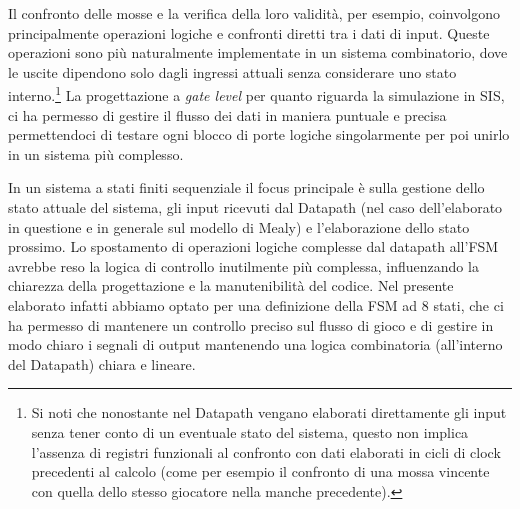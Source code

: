 \documentclass[a4paper]{report}
\begin{document}
Il confronto delle mosse e la verifica della loro validità, per esempio, coinvolgono principalmente operazioni logiche e confronti diretti tra i dati di input.
Queste operazioni sono più naturalmente implementate in un sistema combinatorio, dove le uscite dipendono solo dagli ingressi attuali senza considerare uno stato interno.\footnote{Si noti che nonostante nel Datapath vengano elaborati direttamente gli input senza tener conto di un eventuale stato del sistema, questo non implica l'assenza di registri funzionali al confronto con dati elaborati in cicli di clock precedenti al calcolo (come per esempio il confronto di una mossa vincente con quella dello stesso giocatore nella manche precedente).}
La progettazione a \textit{gate level} per quanto riguarda la simulazione in SIS, ci ha permesso di gestire il flusso dei dati in maniera puntuale e precisa permettendoci di testare ogni blocco di porte logiche singolarmente per poi unirlo in un sistema più complesso. 

In un sistema a stati finiti sequenziale il focus principale è sulla gestione dello stato attuale del sistema, gli input ricevuti dal Datapath (nel caso dell'elaborato in questione e in generale sul modello di Mealy) e l'elaborazione dello stato prossimo.
Lo spostamento di operazioni logiche complesse dal datapath all'FSM avrebbe reso la logica di controllo inutilmente più complessa, influenzando la chiarezza della progettazione e la manutenibilità del codice.
Nel presente elaborato infatti abbiamo optato per una definizione della FSM ad 8 stati, che ci ha permesso di mantenere un controllo preciso sul flusso di gioco e di gestire in modo chiaro i segnali di output mantenendo una logica combinatoria (all'interno del Datapath) chiara e lineare.
\end{document}
